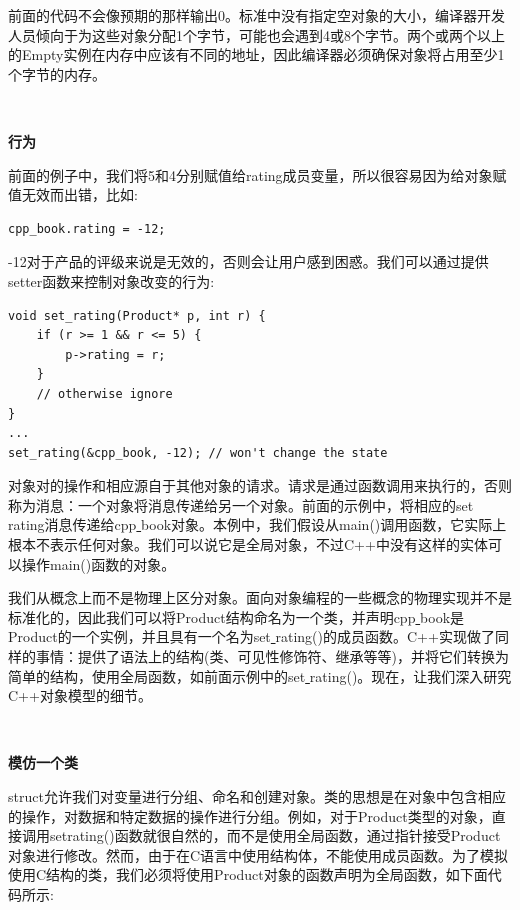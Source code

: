 前面的代码不会像预期的那样输出0。标准中没有指定空对象的大小，编译器开发人员倾向于为这些对象分配1个字节，可能也会遇到4或8个字节。两个或两个以上的Empty实例在内存中应该有不同的地址，因此编译器必须确保对象将占用至少1个字节的内存。 \par

\noindent\textbf{}\ \par
\textbf{行为} \ \par
前面的例子中，我们将5和4分别赋值给rating成员变量，所以很容易因为给对象赋值无效而出错，比如:\par

\begin{lstlisting}[caption={}]
cpp_book.rating = -12;
\end{lstlisting}

-12对于产品的评级来说是无效的，否则会让用户感到困惑。我们可以通过提供setter函数来控制对象改变的行为: \par

\begin{lstlisting}[caption={}]
void set_rating(Product* p, int r) {
	if (r >= 1 && r <= 5) {
		p->rating = r;
	}
	// otherwise ignore
}
...
set_rating(&cpp_book, -12); // won't change the state
\end{lstlisting}

对象对的操作和相应源自于其他对象的请求。请求是通过函数调用来执行的，否则称为消息：一个对象将消息传递给另一个对象。前面的示例中，将相应的set\underline{ }rating消息传递给cpp\underline{ }book对象。本例中，我们假设从main()调用函数，它实际上根本不表示任何对象。我们可以说它是全局对象，不过C++中没有这样的实体可以操作main()函数的对象。 \par
我们从概念上而不是物理上区分对象。面向对象编程的一些概念的物理实现并不是标准化的，因此我们可以将Product结构命名为一个类，并声明cpp\underline{ }book是Product的一个实例，并且具有一个名为set\underline{ }rating()的成员函数。C++实现做了同样的事情：提供了语法上的结构(类、可见性修饰符、继承等等)，并将它们转换为简单的结构，使用全局函数，如前面示例中的set\underline{ }rating()。现在，让我们深入研究C++对象模型的细节。 \par

\noindent\textbf{}\ \par
\textbf{模仿一个类} \ \par
struct允许我们对变量进行分组、命名和创建对象。类的思想是在对象中包含相应的操作，对数据和特定数据的操作进行分组。例如，对于Product类型的对象，直接调用set\underline{}rating()函数就很自然的，而不是使用全局函数，通过指针接受Product对象进行修改。然而，由于在C语言中使用结构体，不能使用成员函数。为了模拟使用C结构的类，我们必须将使用Product对象的函数声明为全局函数，如下面代码所示:\par

